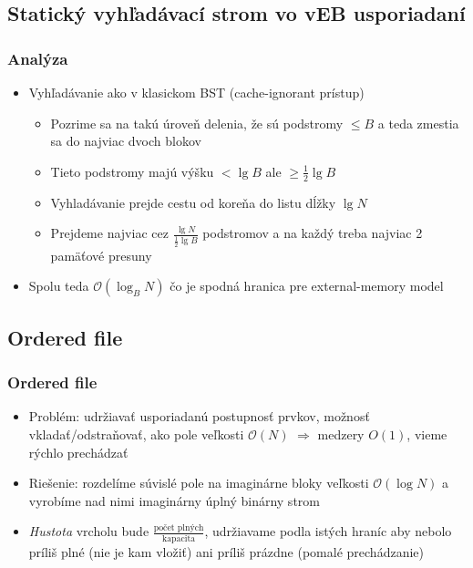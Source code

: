 \documentclass{beamer}
\newcommand{\bigO}{\ensuremath{\mathcal{O}}}
\begin{document}
\subsection{Statický vyhľadávací strom vo vEB usporiadaní}
\begin{frame}
    \frametitle{Analýza}
    \begin{itemize}
        \item Vyhľadávanie ako v klasickom BST (cache-ignorant prístup)
        \begin{itemize}
            \item Pozrime sa na takú úroveň delenia, že sú podstromy $\le B$ a teda zmestia sa do najviac dvoch blokov
            \item Tieto podstromy majú výšku $< \lg{B}$ ale $\ge \frac{1}{2}\lg{B}$
            \item Vyhladávanie prejde cestu od koreňa do listu dĺžky $\lg N$
            \item Prejdeme najviac cez $\frac{\lg N}{\frac{1}{2}\lg{B}}$ podstromov a na každý treba najviac 2 pamäťové presuny
        \end{itemize}
        \item Spolu teda $\bigO(\log_{B}{N})$ čo je spodná hranica pre external-memory model
    \end{itemize}
\end{frame}

\subsection{Ordered file}
\begin{frame}
    \frametitle{Ordered file}
    \begin{itemize}
        \item Problém: udržiavať usporiadanú postupnosť prvkov, možnosť vkladať/odstraňovať, ako pole veľkosti $\bigO(N)$ $\Rightarrow$ medzery $O(1)$, vieme rýchlo prechádzať
        \item Riešenie: rozdelíme súvislé pole na imaginárne bloky veľkosti $\bigO(\log N)$ a vyrobíme nad nimi imaginárny úplný binárny strom
        \item {\em Hustota} vrcholu bude $\frac{\text{počet plných}}{\text{kapacita}}$, udržiavame podla istých hraníc aby nebolo príliš plné (nie je kam vložiť) ani príliš prázdne (pomalé prechádzanie)
    \end{itemize}
\end{frame}
\end{document}
